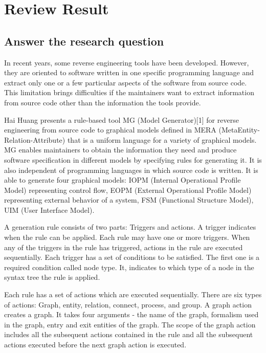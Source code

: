 \documentclass{article}
\begin{document}
\section{Review Result}



\subsection{Answer the research question}

In recent years, some reverse engineering tools have been developed. However, they are oriented to software written in one specific programming language and extract only one or a few particular aspects of the software from source code. This limitation brings difficulties if the maintainers want to extract information from source code other than the information the tools provide. 

Hai Huang presents a rule-based tool MG (Model Generator)[1] for reverse engineering from source code to graphical models defined in MERA (MetaEntity-Relation-Attribute) that is a uniform language for a variety of graphical models. MG enables maintainers to obtain the information they need and produce software specification in different models by specifying rules for generating it. It is also independent of programming languages in which source code is written. It is able to generate four graphical models: IOPM (Internal Operational Profile Model) representing control flow, EOPM (External Operational Profile Model) representing external behavior of a system, FSM (Functional Structure Model), UIM (User Interface Model).

A generation rule consists of two parts: Triggers and actions. A trigger indicates when the rule can be applied. Each rule may have one or more triggers. When any of the triggers in the rule has triggered, actions in the rule are executed sequentially. Each trigger has a set of conditions to be satisfied. The first one is a required condition called node type. It, indicates to which type of a node in the syntax tree the rule is applied.

Each rule has a set of actions which are executed sequentially. There are six types of actions: Graph, entity, relation, connect, process, and group. A graph action creates a graph. It takes four arguments - the name of the graph, formalism used in the graph, entry and exit entities of the graph. The scope of the graph action includes all the subsequent actions contained in the rule and all the subsequent actions executed before the next graph action is executed.
\end{document}
